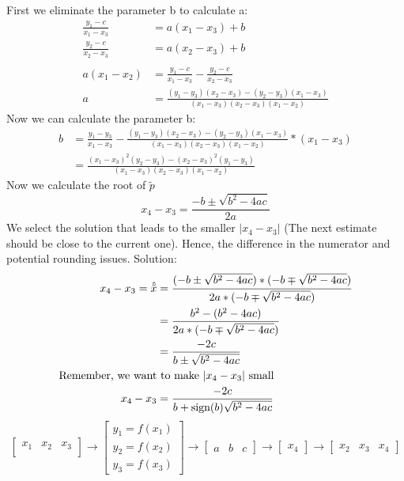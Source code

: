 First we eliminate the parameter b to calculate a:
\begin{align*}
    \frac{y_1-c}{x_1-x_3}&=a(x_1-x_3)+b\\
    \frac{y_2-c}{x_2-x_3}&=a(x_2-x_3)+b\\
    \\
    a(x_1-x_2)&=\frac{y_1-c}{x_1-x_3}-\frac{y_2-c}{x_2-x_3}\\
    a&=\frac{(y_1-y_3)(x_2-x_3)-(y_2-y_3)(x_1-x_3)}{(x_1-x_3)(x_2-x_3)(x_1-x_2)}
\end{align*}
Now we can calculate the parameter b:
\begin{align*}
    b &= \frac{y_1-y_3}{x_1-x_3}-\frac{(y_1-y_3)(x_2-x_3)-(y_2-y_3)(x_1-x_3)}
    {(x_1-x_3)(x_2-x_3)(x_1-x_2)}*(x_1-x_3)\\
    &=\frac{(x_1-x_3)^2(y_2-y_3)-(x_2-x_3)^2(y_1-y_3)}{(x_1-x_3)(x_2-x_3)(x_1-x_2)}
\end{align*}
Now we calculate the root of $\tilde{p}$
\begin{equation*}
    x_4-x_3=\frac{-b \pm \sqrt{b^2-4ac}}{2a}
\end{equation*}
We select the solution that leads to the smaller $\lvert x_4- x_3 \rvert$ (The next estimate should be close to the current one).
Hence, the difference in the numerator and potential rounding issues.
Solution:
\begin{align*}
    x_4-x_3 = \hat{\tilde{x}} &= \cfrac{(-b \pm \sqrt {b^2-4ac})*(-b \mp \sqrt{b^2-4ac})}{2a*(-b \mp \sqrt {b^2-4ac})}\\
    &=\frac{b^2-(b^2-4ac)}{2a*(-b \mp \sqrt{b^2-4ac})}\\
    &=\frac{-2c}{b \pm \sqrt {b^2-4ac}}\\
    \text{Remember, we want} &\text{ to make $\lvert x_4-x_3 \rvert$ small}\\
    x_4-x_3&= \frac{-2c}{b+\text{sign}(b)\sqrt {b^2-4ac}}
\end{align*}
\begin{equation*}
    \begin{bmatrix}
        x_1 &x_2 &x_3\\
    \end{bmatrix}
    \to
    \begin{bmatrix*}
        y_1=f(x_1)\\
        y_2=f(x_2)\\
        y_3=f(x_3)
    \end{bmatrix*}
    \to
    \begin{bmatrix*}
        a &b &c
    \end{bmatrix*}
    \to
    \begin{bmatrix*}
        x_4
    \end{bmatrix*}
    \to
    \begin{bmatrix*}
        x_2 &x_3 &x_4
    \end{bmatrix*}
\end{equation*}

